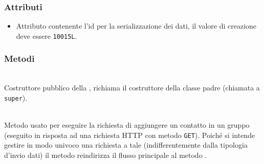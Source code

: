 \subsubsection*{Attributi}

\begin{itemize}
	\item{}
	Attributo contenente l'id per la serializzazione dei dati, il valore di creazione deve essere \texttt{10015L}.
\end{itemize}

\subsubsection*{Metodi}

\begin{description}
	\item{}\\
	Costruttore pubblico della , richiama il costruttore della classe padre (chiamata a \texttt{super}).
	
	\item{}\\
	Metodo usato per eseguire la richiesta di aggiungere un contatto in un gruppo (eseguito in risposta ad una richiesta HTTP con metodo \texttt{GET}). Poiché si intende gestire in modo univoco una richiesta a tale  (indifferentemente dalla tipologia d'invio dati) il metodo reindirizza il flusso principale al metodo .
	

\end{description}
